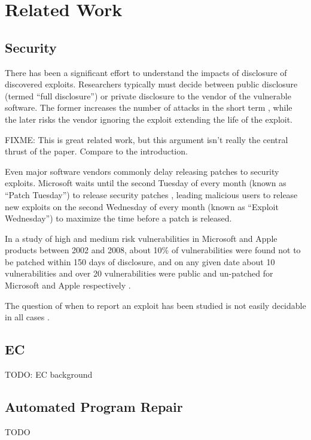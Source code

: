 \documentclass{sigcomm-alternate}
\begin{document}
\section{Related Work}
\label{sec-5}
\subsection{Security}
\label{sec-5-1}
There has been a significant effort to understand the impacts of
disclosure of discovered exploits.  Researchers typically must decide
between public disclosure (termed ``full disclosure'') or private
disclosure to the vendor of the vulnerable software.  The former
increases the number of attacks in the short term \cite{arora2006does},
while the later risks the vendor ignoring the exploit extending the
life of the exploit.

FIXME: This is great related work, but this argument isn't really the
central thrust of the paper. Compare to the introduction.

Even major software vendors commonly delay releasing patches to
security exploits.  Microsoft waits until the second Tuesday of every
month (known as ``Patch Tuesday'') to release security patches
\cite{lemos2003microsoft}, leading malicious users to release new
exploits on the second Wednesday of every month (known as ``Exploit
Wednesday'') to maximize the time before a patch is released.

In a study of high and medium risk vulnerabilities in Microsoft and
Apple products between 2002 and 2008, about 10\% of
vulnerabilities were found not to be patched within 150 days of
disclosure, and on any given date about 10 vulnerabilities and over 20
vulnerabilities were public and un-patched for Microsoft and Apple
respectively \cite{frei20080}.

The question of when to report an exploit has been studied is not
easily decidable in all cases \cite{arora2008optimal}.

\subsection{EC}
\label{sec-5-2}

TODO: EC background

\subsection{Automated Program Repair}
\label{sec-5-3}

TODO
\end{document}
